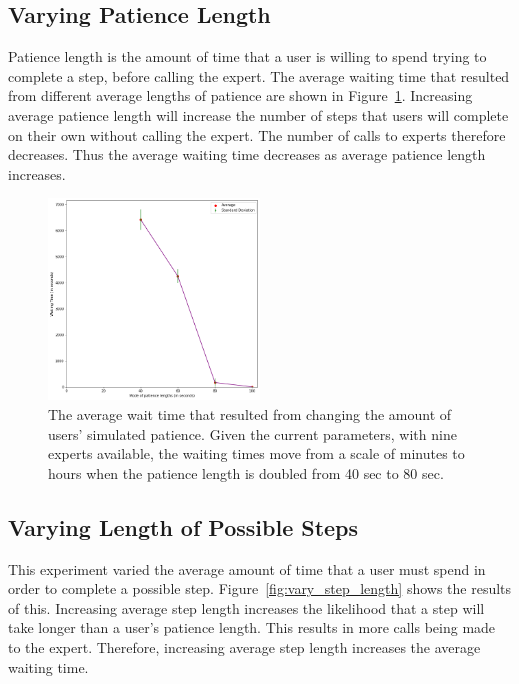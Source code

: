 \subsection{Varying Patience Length}

Patience length is the amount of time that a user is willing to spend trying to
complete a step, before calling the expert.
The average waiting time that resulted from different average lengths of
patience are shown in Figure~\ref{fig:vary_patience}.
Increasing average patience length will increase the number of steps that users
will complete on their own without calling the expert.
The number of calls to experts therefore decreases.
Thus the average waiting time decreases as average patience length increases.

\begin{figure}[h]
  \includegraphics[width=0.5\textwidth]{figures/montecarlo/vary_patience.png}
  \caption{
    The average wait time that resulted from changing the amount of users'
    simulated patience.
    Given the current parameters, with nine experts available, the waiting times
    move from a scale of minutes to hours when the patience length is doubled
    from 40 sec to 80 sec.
  }\label{fig:vary_patience}
\end{figure}

\subsection{Varying Length of Possible Steps}

This experiment varied the average amount of time that a user must spend in
order to complete a possible step.
Figure~\ref{fig:vary_step_length} shows the results of this.
Increasing average step length increases the likelihood that a step will take
longer than a user's patience length.
This results in more calls being made to the expert.
Therefore, increasing average step length increases the average waiting time.

